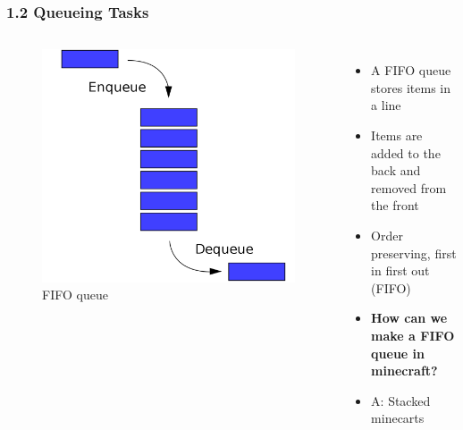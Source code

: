 \documentclass[aspectratio=169]{beamer}
\begin{document}
\begin{frame}
	\frametitle{1.2 Queueing Tasks}
    \begin{columns}

	\begin{figure}
		\includegraphics[width=1\textwidth]{fifo.png}
		\caption{FIFO queue}
	\end{figure}

    \begin{itemize}
        \item A FIFO queue stores items in a line
		\item Items are added to the back and removed from the front
		\item Order preserving, first in first out (FIFO)
		\item \textbf{How can we make a FIFO queue in minecraft?}
		\item A: Stacked minecarts
	\end{itemize}
    \end{columns}
\end{frame}
\end{document}
